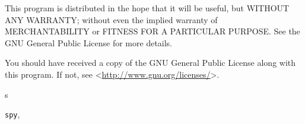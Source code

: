 \documentclass[letterpaper,10pt,english]{sphinxmanual}
\begin{document}
This program is distributed in the hope that it will be useful,
but WITHOUT ANY WARRANTY; without even the implied warranty of
MERCHANTABILITY or FITNESS FOR A PARTICULAR PURPOSE.  See the
GNU General Public License for more details.

You should have received a copy of the GNU General Public License
along with this program.  If not, see \textless{}\href{http://www.gnu.org/licenses/}{http://www.gnu.org/licenses/}\textgreater{}.


\renewcommand{\indexname}{Python Module Index}
\begin{theindex}
\def\bigletter#1{{\Large\sffamily#1}\nopagebreak\vspace{1mm}}
\bigletter{s}
\item {\texttt{spy}}, \pageref{index:module-spy}
\end{theindex}

\renewcommand{\indexname}{Index}
\printindex
\end{document}
